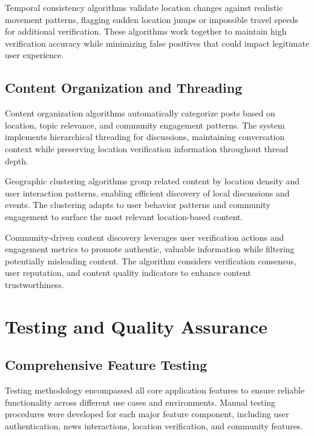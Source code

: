 Temporal consistency algorithms validate location changes against realistic movement patterns, flagging sudden location jumps or impossible travel speeds for additional verification. These algorithms work together to maintain high verification accuracy while minimizing false positives that could impact legitimate user experience.

\subsection{Content Organization and Threading}
\label{subsec:content-organization}

Content organization algorithms automatically categorize posts based on location, topic relevance, and community engagement patterns. The system implements hierarchical threading for discussions, maintaining conversation context while preserving location verification information throughout thread depth.

Geographic clustering algorithms group related content by location density and user interaction patterns, enabling efficient discovery of local discussions and events. The clustering adapts to user behavior patterns and community engagement to surface the most relevant location-based content.

Community-driven content discovery leverages user verification actions and engagement metrics to promote authentic, valuable information while filtering potentially misleading content. The algorithm considers verification consensus, user reputation, and content quality indicators to enhance content trustworthiness.

\section{Testing and Quality Assurance}
\label{sec:testing}

\subsection{Comprehensive Feature Testing}
\label{subsec:feature-testing}

Testing methodology encompassed all core application features to ensure reliable functionality across different use cases and environments. Manual testing procedures were developed for each major feature component, including user authentication, news interactions, location verification, and community features.

